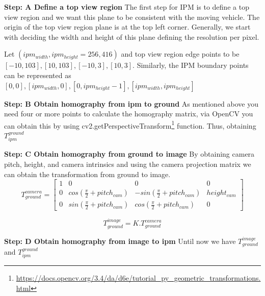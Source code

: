      \textbf{Step: A Define a top view region \newline} 
     The first step for IPM is to define a top view region and we want this plane to be consistent with the moving vehicle. The origin of the top view region plane is at the top left corner. Generally, we start with deciding the width and height of this plane defining the resolution per pixel. 
     
     Let $(ipm_{width}, ipm_{height} = 256, 416)$ and top view region edge points to be $[-10, 103], [10, 103], [-10, 3], [10, 3]$. Similarly, the IPM boundary points can be represented as $[0, 0],
                                                              [ipm_{width}, 0],
                                                              [0, ipm_{height}-1],
                                                              [ipm_{width}, ipm_{height}]$

     \textbf{Step: B Obtain homography from ipm to ground} \newline
     As mentioned above you need four or more points to calculate the homography matrix, via OpenCV you can obtain this by using cv2.getPerspectiveTransform\footnote{\url{https://docs.opencv.org/3.4/da/d6e/tutorial_py_geometric_transformations.html}} function. 
     Thus, obtaining $T^{ground}_{ipm}$
     
     \textbf{Step: C Obtain homography from ground to image} \newline
     By obtaining camera pitch, height, and camera intrinsics and using the camera projection matrix we can obtain the transformation from ground to image. 
     \begin{equation}
     T_{ground}^{camera } = \begin{bmatrix}1 & 0 & 0 & 0 \\0 & cos(\frac{\pi}{2} + pitch_{cam}) & -sin(\frac{\pi}{2} + pitch_{cam}) & height_{cam} \\ 0 &sin(\frac{\pi}{2} + pitch_{cam}) &cos(\frac{\pi}{2} + pitch_{cam}) & 0   \end{bmatrix}
     \end{equation}
     
     \begin{equation}
     T_{ground}^{image} = K . T_{ground}^{camera }
    \end{equation}
    
    
     \textbf{Step: D Obtain homography from image to ipm} \newline
    Until now we have $T^{image}_{ground}$ and $T^{ground}_{ipm}$
    
